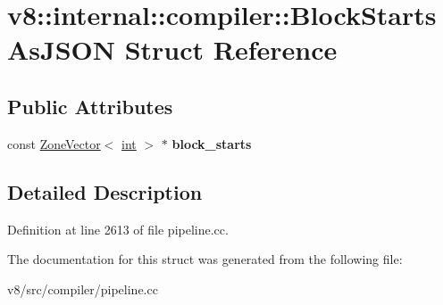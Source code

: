 \hypertarget{structv8_1_1internal_1_1compiler_1_1BlockStartsAsJSON}{}\section{v8\+:\+:internal\+:\+:compiler\+:\+:Block\+Starts\+As\+J\+S\+ON Struct Reference}
\label{structv8_1_1internal_1_1compiler_1_1BlockStartsAsJSON}
\subsection*{Public Attributes}
\begin{DoxyCompactItemize}
\item 
\mbox{\label{structv8_1_1internal_1_1compiler_1_1BlockStartsAsJSON_a66694dd7e436c0ce7f23f9e11ec7a964}} 
const \mbox{\hyperlink{classv8_1_1internal_1_1ZoneVector}{Zone\+Vector}}$<$ \mbox{\hyperlink{classint}{int}} $>$ $\ast$ {\bfseries block\+\_\+starts}
\end{DoxyCompactItemize}


\subsection{Detailed Description}


Definition at line 2613 of file pipeline.\+cc.



The documentation for this struct was generated from the following file\+:\begin{DoxyCompactItemize}
\item 
v8/src/compiler/pipeline.\+cc\end{DoxyCompactItemize}
